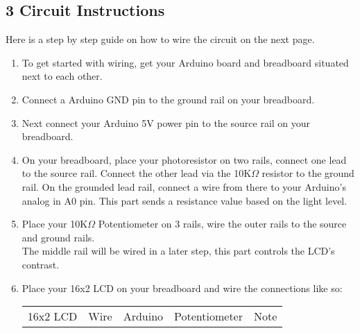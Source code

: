 \documentclass{article}
\newcommand{\enterProblemHeader}[1]{
}
\newcommand{\exitProblemHeader}[1]{
}
\newcounter{partCounter}
\newcounter{homeworkProblemCounter}
\newenvironment{homeworkProblem}[1]{
    \setcounter{partCounter}{1}
}{
}
\begin{document}

\begin{homeworkProblem}{}
    \vspace{-20pt}\subsection{3 Circuit Instructions}
    \vspace{-5pt}Here is a step by step guide on how to wire the circuit on the next page.
    \begin{enumerate}
        \item
        To get started with wiring, get your Arduino board and breadboard situated next
        to each other.
        \item \vspace{-5pt}
        Connect a Arduino GND pin to the ground rail on your breadboard.
        \item \vspace{-5pt}
        Next connect your Arduino 5V power pin to the source rail on your breadboard.
        \item \vspace{-5pt}
        On your breadboard, place your photoresistor on two rails, connect one lead to 
        the source rail. Connect the other lead via the 10K$\Omega$ resistor to the ground rail. On the 
        grounded lead rail, connect a wire from there to your Arduino's analog in A0 
        pin. This part sends
        a resistance value based on the light level.
        \item \vspace{-5pt}
        Place your 10K$\Omega$ Potentiometer on 3 rails, wire the outer rails to the 
        source and ground rails. \\The middle rail will be wired in a later step, this
        part controls the LCD's contrast.
        \item \vspace{-5pt}
        Place your 16x2 LCD on your breadboard and wire the connections like so: \\
        \begin{tabularx}{0.9\textwidth} { 
            | >{\centering\arraybackslash}X 
            | >{\centering\arraybackslash}X 
            | >{\centering\arraybackslash}X 
            | >{\centering\arraybackslash}X 
            | >{\centering\arraybackslash}X | }
            \hline 16x2 LCD & Wire & Arduino & Potentiometer & Note \\

\end{tabularx}
\end{enumerate}
\end{homeworkProblem}
\end{document}
